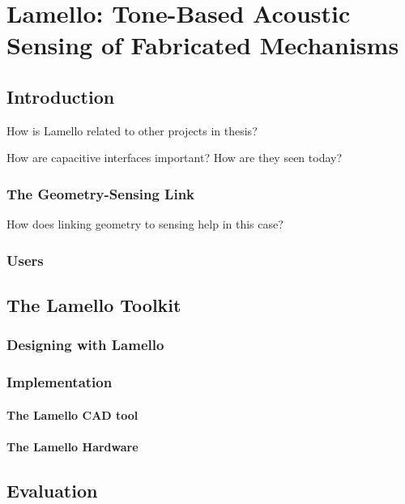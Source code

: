 \chapter{Lamello: Tone-Based Acoustic Sensing of Fabricated Mechanisms}

\section{Introduction}

How is Lamello related to other projects in thesis?

How are capacitive interfaces important?  How are they seen today?

\subsection{The Geometry-Sensing Link}

How does linking geometry to sensing help in this case?

\subsection{Users}

\section{The Lamello Toolkit}

\subsection{Designing with Lamello}

\subsection{Implementation}

\subsubsection{The Lamello CAD tool}

\subsubsection{The Lamello Hardware}

\section{Evaluation}

